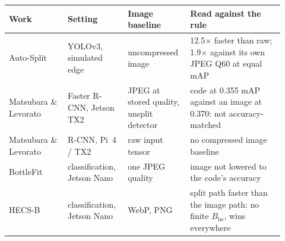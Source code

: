 \begin{tabular}{@{}p{0.2\linewidth}p{0.2\linewidth}p{0.2\linewidth}p{0.32\linewidth}@{}}\toprule
Work & Setting & Image baseline & Read against the rule \\\midrule
Auto-Split~\cite{banitalebi2021autosplit} & YOLOv3, simulated edge & uncompressed image & 12.5$\times$ faster than raw; 1.9$\times$ against its own JPEG Q60 at equal mAP \\
Matsubara \& Levorato~\cite{matsubara2021neural} & Faster R-CNN, Jetson TX2 & JPEG at stored quality, unsplit detector & code at 0.355 mAP against an image at 0.370: not accuracy-matched \\
Matsubara \& Levorato~\cite{matsubara2020complex} & R-CNN, Pi~4 / TX2 & raw input tensor & no compressed image baseline \\
BottleFit~\cite{matsubara2022bottlefit} & classification, Jetson Nano & one JPEG quality & image not lowered to the code's accuracy \\
HECS-B~\cite{zhong2025hecsb} & classification, Jetson Nano & WebP, PNG & split path faster than the image path: no finite $B_{\mathrm{be}}$, wins everywhere \\
\bottomrule
\end{tabular}
